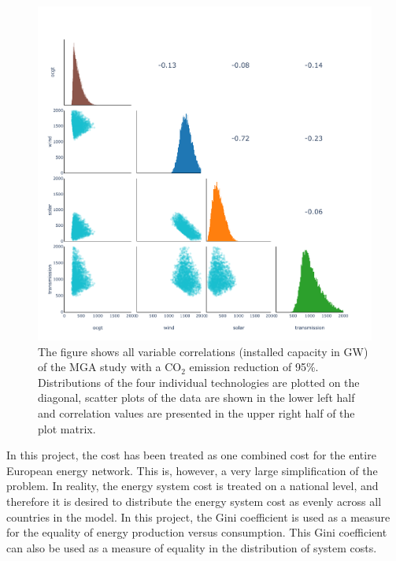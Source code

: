 \begin{figure}[h]\center
	\includegraphics[width=1.\textwidth,trim={0 0cm 0 0cm},clip]{./Images/corelation_4D_95}
	\caption{The figure shows all variable correlations (installed capacity in GW) of the MGA study with a $\text{CO}_2$ emission reduction of 95\%. Distributions of the four individual technologies are plotted on the diagonal, scatter plots of the data are shown in the lower left half and correlation values are presented in the upper right half of the plot matrix. }
	\label{fig:corelation_2}
\end{figure}

In this project, the cost has been treated as one combined cost for the entire European energy network. This is, however, a very large simplification of the problem. In reality, the energy system cost is treated on a national level, and therefore it is desired to distribute the energy system cost as evenly across all countries in the model. In this project, the Gini coefficient is used as a measure for the equality of energy production versus consumption. This Gini coefficient can also be used as a measure of equality in the distribution of system costs. 



